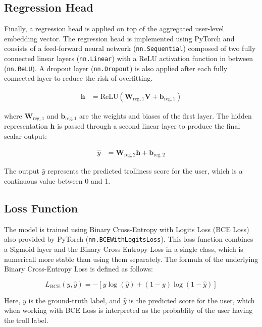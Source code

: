 \documentclass[twoside]{ctuthesis}
\theoremstyle{plain}
\theoremstyle{definition}
\theoremstyle{note}
\begin{document}
\subsection{Regression Head}

Finally, a regression head is applied on top of the aggregated user-level embedding vector. The regression head is implemented using PyTorch and consists of a feed-forward neural network (\texttt{nn.Sequential}) composed of two fully connected linear layers (\texttt{nn.Linear}) with a ReLU activation function in between (\texttt{nn.ReLU}). A dropout layer (\texttt{nn.Dropout}) is also applied after each fully connected layer to reduce the risk of overfitting.

\begin{align}
    \mathbf{h} &= \mathrm{ReLU}(\mathbf{W}_{\mathrm{reg,1}} \mathbf{V} + \mathbf{b}_{\mathrm{reg,1}})
\end{align}

where \( \mathbf{W}_{\mathrm{reg,1}} \) and \( \mathbf{b}_{\mathrm{reg,1}} \) are the weights and biases of the first layer. The hidden representation \( \mathbf{h} \) is passed through a second linear layer to produce the final scalar output:

\begin{align}
    \hat{y} &= \mathbf{W}_{\mathrm{reg,2}} \mathbf{h} + \mathbf{b}_{\mathrm{reg,2}}
\end{align}

The output \( \hat{y} \) represents the predicted trolliness score for the user, which is a continuous value between 0 and 1.
\subsection{Loss Function}

The model is trained using Binary Cross-Entropy with Logits Loss (BCE Loss) also provided by PyTorch (\texttt{nn.BCEWithLogitsLoss}). This loss function combines a Sigmoid layer and the Binary Cross-Entropy Loss in a single class, which is numericall more stable than using them separately. The formula of the underlying Binary Cross-Entropy Loss is defined as follows:

\begin{equation}
    L_{\mathrm{BCE}}(y, \hat{y}) = - \left[ y \log(\hat{y}) + (1 - y) \log(1 - \hat{y}) \right]
\end{equation}

Here, \( y \) is the ground-truth label, and \( \hat{y} \) is the predicted score for the user, which when working with BCE Loss is interpreted as the probablity of the user having the troll label.\par
\end{document}
